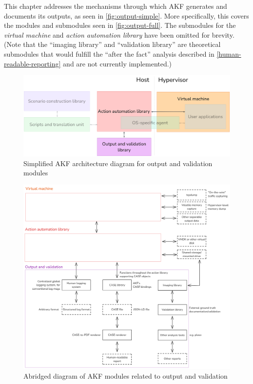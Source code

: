 \documentclass[letterpaper,12pt]{report}
\begin{document}
This chapter addresses the mechanisms through which AKF generates and
documents its outputs, as seen in \autoref{fig:output-simple}. More
specifically, this covers the modules and submodules seen in
\autoref{fig:output-full}. The submodules for the \emph{virtual machine}
and \emph{action automation library} have been omitted for brevity.
(Note that the ``imaging library'' and ``validation library'' are
theoretical submodules that would fulfill the ``after the fact''
analysis described in \autoref{human-readable-reporting} and are not currently implemented.)

\begin{figure}[htbp]
\centering
\includegraphics[width=1\linewidth]{output-and-validation-simple.png}
\caption{Simplified AKF architecture diagram for output and validation
modules}\label{fig:output-simple}
\end{figure}

\begin{figure}[htbp]
\centering
\includegraphics[width=1\linewidth]{output-and-validation-full.png}
\caption{Abridged diagram of AKF modules related to output and
validation}\label{fig:output-full}
\end{figure}
\end{document}
